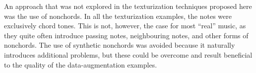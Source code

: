 
An approach that was not explored in the texturization
techniques proposed here was the use of \gls{nonchord}s. In
all the texturization examples, the notes were exclusively
chord tones. This is not, however, the case for most
``real'' music, as they quite often introduce passing notes,
neighbouring notes, and other forms of \gls{nonchord}s. The
use of synthetic \gls{nonchord}s was avoided because it
naturally introduces additional problems, but these could be
overcome and result beneficial to the quality of the
data-augmentation examples.
